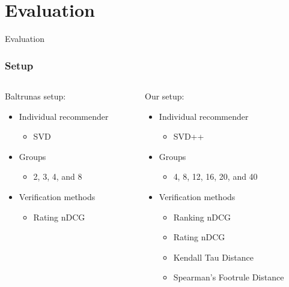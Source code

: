 \section{Evaluation}
\begin{frame}
     \begin{center}
     	\huge Evaluation 
     \end{center}
\end{frame}

\begin{frame}
\frametitle{Setup}
\begin{columns}
\begin{column}{0.5\textwidth}
Baltrunas setup:
\begin{itemize}
\item Individual recommender
\begin{itemize}
\item SVD
\end{itemize}
\item Groups
\begin{itemize}
\item 2, 3, 4, and 8
\end{itemize}

\item Verification methods
\begin{itemize}
\item Rating nDCG
\end{itemize}
\end{itemize}

\vspace{1cm}
\end{column}
\begin{column}{0.5\textwidth}
Our setup:
\begin{itemize}
\item Individual recommender
\begin{itemize}
\item SVD++
\end{itemize}
\item Groups
\begin{itemize}
\item 4, 8, 12, 16, 20, and 40
\end{itemize}

\item Verification methods
\begin{itemize}
\item Ranking nDCG
\item Rating nDCG
\item Kendall Tau Distance 
\item Spearman's Footrule Distance 
\end{itemize}
\end{itemize}
\end{column}
\end{columns}
\end{frame}

